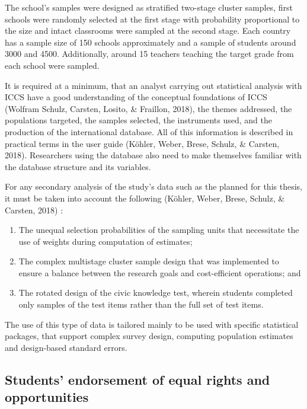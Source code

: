 \documentclass[12pt,a4paper,oneside]{reedthesis}
\begin{document}
The school's samples were designed as stratified two-stage cluster samples, first schools were randomly selected at the first stage with probability proportional to the size and intact classrooms were sampled at the second stage. Each country has a sample size of 150 schools approximately and a sample of students around 3000 and 4500. Additionally, around 15 teachers teaching the target grade from each school were sampled.

It is required at a minimum, that an analyst carrying out statistical analysis with ICCS have a good understanding of the conceptual foundations of ICCS (Wolfram Schulz, Carsten, Losito, \& Fraillon, 2018), the themes addressed, the populations targeted, the samples selected, the instruments used, and the production of the international database. All of this information is described in practical terms in the user guide (Köhler, Weber, Brese, Schulz, \& Carsten, 2018). Researchers using the database also need to make themselves familiar with the database structure and its variables.

For any secondary analysis of the study's data such as the planned for this thesis, it must be taken into account the following (Köhler, Weber, Brese, Schulz, \& Carsten, 2018) :
\begin{enumerate}
\def\labelenumi{\arabic{enumi}.}
\item
  The unequal selection probabilities of the sampling units that necessitate the use of weights during computation of estimates;
\item
  The complex multistage cluster sample design that was implemented to ensure a balance between the research goals and cost-efficient operations; and
\item
  The rotated design of the civic knowledge test, wherein students completed only samples of the test items rather than the full set of test items.
\end{enumerate}
The use of this type of data is tailored mainly to be used with specific statistical packages, that support complex survey design, computing population estimates and design-based standard errors.

\hypertarget{students-endorsement-of-equal-rights-and-opportunities}{%
\subsection{Students' endorsement of equal rights and opportunities}\label{students-endorsement-of-equal-rights-and-opportunities}}
\end{document}

